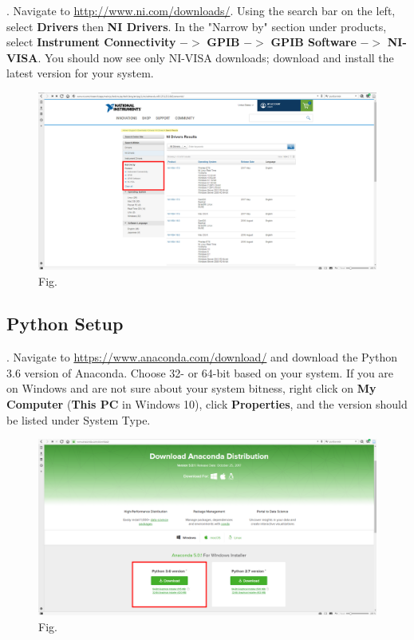 \documentclass[]{article}
\begin{document}
\ex. Navigate to \url{http://www.ni.com/downloads/}. Using the search bar on the left, select \textbf{Drivers} then \textbf{NI Drivers}. In the "Narrow by" section under products, select \textbf{Instrument Connectivity} $->$ \textbf{GPIB} $->$ \textbf{GPIB Software} $->$ \textbf{NI-VISA}. You should now see only NI-VISA downloads; download and install the latest version for your system.

\begin{figure}[H]
	\centering
	\includegraphics[width=\linewidth]{Figures/nivisa}
	\caption{Fig.}
	\label{fig:nivisa}
\end{figure}

\subsection{Python Setup}

\ex. Navigate to \url{https://www.anaconda.com/download/} and download the Python 3.6 version of Anaconda. Choose 32- or 64-bit based on your system. If you are on Windows and are not sure about your system bitness, right click on \textbf{My Computer} (\textbf{This PC} in Windows 10), click \textbf{Properties}, and the version should be listed under System Type.

\begin{figure}[H]
	\centering
	\includegraphics[width=\linewidth]{Figures/anaconda}
	\caption{Fig.}
	\label{fig:anaconda}
\end{figure}
\end{document}
